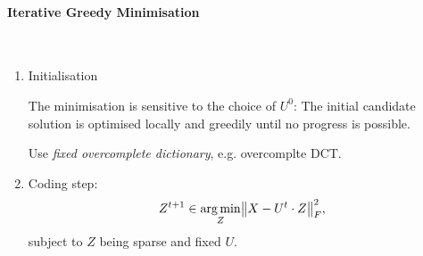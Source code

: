 \paragraph{Iterative Greedy Minimisation} $\ $
\begin{enumerate}
    \item Initialisation
    
        The minimisation is sensitive to the choice of $U^0$: The initial candidate solution is optimised locally and greedily until no progress is possible.
        Use \emph{fixed overcomplete dictionary}, e.g. overcomplte DCT.
    \item Coding step:
        \begin{align*}
             Z^{t+1} \in \argmin_Z \norm{X-U^t\cdot Z}_F^2,
        \end{align*}
        subject to $Z$ being sparse and fixed $U$.
        

\end{enumerate}
